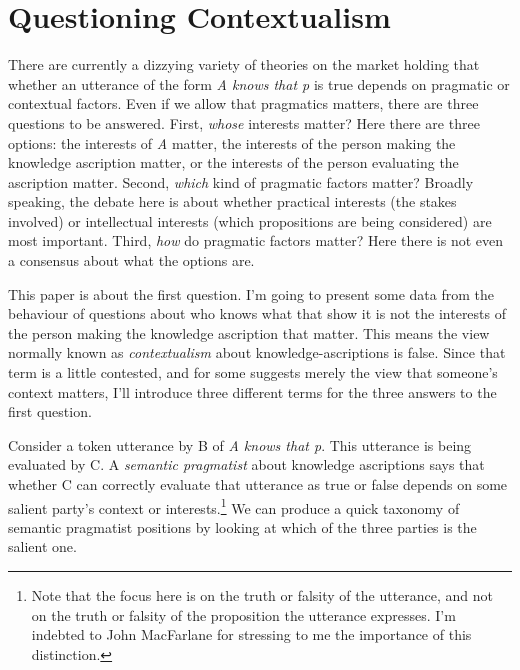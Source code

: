 

%
%
%
%
%
%
%
%
%
%
\chapter{Questioning Contextualism}


There are currently a dizzying variety of theories on the market holding that whether an utterance of the form \textit{A knows that p} is true depends on pragmatic or contextual factors. Even if we allow that pragmatics matters, there are three questions to be answered. First, \textit{whose} interests matter? Here there are three options: the interests of \textit{A} matter, the interests of the person making the knowledge ascription matter, or the interests of the person evaluating the ascription matter. Second, \textit{which} kind of pragmatic factors matter? Broadly speaking, the debate here is about whether practical interests (the stakes involved) or intellectual interests (which propositions are being considered) are most important. Third, \textit{how} do pragmatic factors matter? Here there is not even a consensus about what the options are.

This paper is about the first question. I'm going to present some data from the behaviour of questions about who knows what that show it is not the interests of the person making the knowledge ascription that matter. This means the view normally known as \textit{contextualism} about knowledge-ascriptions is false. Since that term is a little contested, and for some suggests merely the view that someone's context matters, I'll introduce three different terms for the three answers to the first question. 

Consider a token utterance by B of \textit{A knows that p}. This utterance is being evaluated by C. A \textit{semantic pragmatist} about knowledge ascriptions says that whether C can correctly evaluate that utterance as true or false depends on some salient party's context or interests.\footnote{Note that the focus here is on the truth or falsity of the utterance, and not on the truth or falsity of the proposition the utterance expresses. I'm indebted to John MacFarlane for stressing to me the importance of this distinction.} We can produce a quick taxonomy of semantic pragmatist positions by looking at which of the three parties is the salient one.

